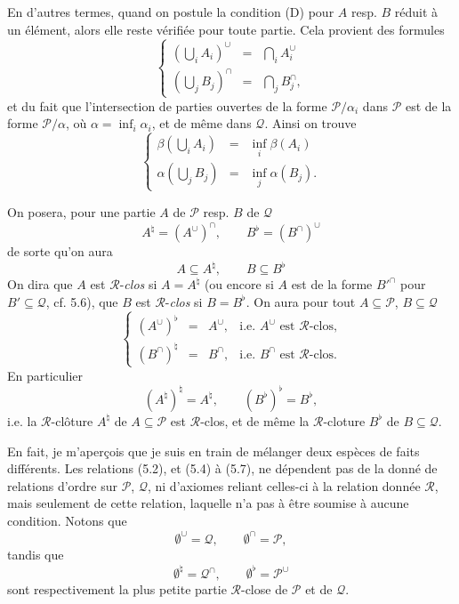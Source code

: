 \documentclass[11pt]{article}
\newcommand{\printedpage}[1]{\marginpar{\footnotesize p.~#1}}
\def\dcprintedpending{}
\newcommand{\msp}[1]{\marginpar{\footnotesize\raggedright
  \ifx\dcprintedpending\empty\else p.~\dcprintedpending\par\fi
  [#1]}\gdef\dcprintedpending{}}
\newcommand{\cP}{\mathcal{P}}
\newcommand{\cQ}{\mathcal{Q}}
\newcommand{\cR}{\mathcal{R}}
\begin{document}
En d'autres termes, quand on postule la condition (D) pour $A$ resp. $B$ réduit à un élément, alors elle reste vérifiée pour toute partie. Cela provient des formules
\[
\left\{
\begin{array}{lcl}
(\bigcup_i A_i)^\cup & = & \bigcap_i A_i^\cup \\[1ex]
(\bigcup_j B_j)^\cap & = & \bigcap_j B_j^\cap,
\end{array}
\right.
\tag*{(5.2)}
\]
et du fait que l'intersection de parties ouvertes de la forme $\mathcal{P}/\alpha_i$ dans $\mathcal{P}$ est de la forme $\mathcal{P}/\alpha$, où $\alpha = \inf_i \alpha_i$, et de même dans $\mathcal{Q}$. Ainsi on trouve
\[
\left\{
\begin{array}{lcl}
\beta(\bigcup_i A_i) & = & \inf_i \beta(A_i) \\[1ex]
\alpha(\bigcup_j B_j) & = & \inf_j \alpha(B_j).
\end{array}
\right.
\tag*{(5.3)}
\]

\printedpage{44}

On posera, pour une partie $A$ de $\cP$ resp. $B$ de $\cQ$
\[
A^{\natural} = (A^{\cup})^{\cap}, \qquad B^{\flat} = (B^{\cap})^{\cup}
\tag*{(5.4)}
\]
de sorte qu'on aura
\[
A \subseteq A^{\natural}, \qquad B \subseteq B^{\flat}
\tag*{(5.5)}
\]
On dira que $A$ est $\cR$-\textit{clos} si $A = A^{\natural}$ (ou encore si $A$ est de la forme $B'^{\cap}$ pour $B' \subseteq \cQ$, cf. 5.6), que
\msp{71}
$B$ est $\cR$-\textit{clos} si $B = B^{\flat}$. On aura pour tout $A \subseteq \cP$, $B \subseteq \cQ$
\[
\left\{
\begin{array}{rcll}
(A^{\cup})^{\flat} & = & A^{\cup}, & \text{i.e. } A^{\cup} \text{ est } \cR\text{-clos,}\\[1ex]
(B^{\cap})^{\natural} & = & B^{\cap}, & \text{i.e. } B^{\cap} \text{ est } \cR\text{-clos.}
\end{array}
\right.
\tag*{(5.6)}
\]
En particulier
\[
(A^{\natural})^{\natural} = A^{\natural}, \qquad (B^{\flat})^{\flat} = B^{\flat},
\tag*{(5.7)}
\]
i.e. la $\cR$-clôture $A^{\natural}$ de $A \subseteq \cP$ est $\cR$-clos, et de même la $\cR$-cloture $B^{\flat}$ de $B \subseteq \cQ$. %

En fait, je m'aperçois que je suis en train de mélanger deux espèces de faits différents. Les relations (5.2), et (5.4) à (5.7), ne dépendent pas de la donné de relations d'ordre sur $\cP$, $\cQ$, ni d'axiomes reliant celles-ci à la relation donnée $\cR$, mais seulement de cette relation, laquelle n'a pas à être soumise à aucune condition. Notons que %
\[
\emptyset^{\cup} = \cQ, \qquad \emptyset^{\cap} = \cP,
\tag*{(5.8)}
\]
tandis que
\[
\emptyset^{\natural} = \cQ^{\cap}, \qquad \emptyset^{\flat} = \cP^{\cup}
\tag*{(5.9)}
\]
sont respectivement la plus petite partie $\cR$-close de $\cP$ et de $\cQ$.
\end{document}
